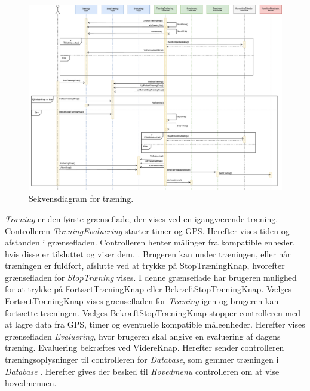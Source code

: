 \begin{figure} [H]
\centering
\includegraphics[width=1.55\textwidth, angle=90]{figures/Sek/SEKTraening}
\caption{Sekvensdiagram for træning. }
\label{fig:SEKTraening}
\end{figure}

\noindent
\textit{Træning} er den første grænseflade, der vises ved en igangværende træning. Controlleren \textit{TræningEvaluering} starter timer og GPS. Herefter vises tiden og afstanden i grænsefladen. Controlleren henter målinger fra kompatible enheder, hvis disse er tilsluttet og viser dem. . Brugeren kan under træningen, eller når træningen er fuldført, afslutte ved at trykke på StopTræningKnap, hvorefter grænsefladen for \textit{StopTræning} vises. I denne grænseflade har brugeren mulighed for at trykke på FortsætTræningKnap eller BekræftStopTræningKnap. Vælges FortsætTræningKnap vises grænsefladen for \textit{Træning} igen og brugeren kan fortsætte træningen. Vælges BekræftStopTræningKnap stopper controlleren med at lagre data fra GPS, timer og eventuelle kompatible måleenheder. Herefter vises grænsefladen \textit{Evaluering}, hvor brugeren skal angive en evaluering af dagens træning. Evaluering bekræftes ved VidereKnap. Herefter sender controlleren træningsoplysninger til controlleren for \textit{Database}, som gemmer træningen i \textit{Database} . Herefter gives der besked til \textit{Hovedmenu} controlleren om at vise hovedmenuen.




